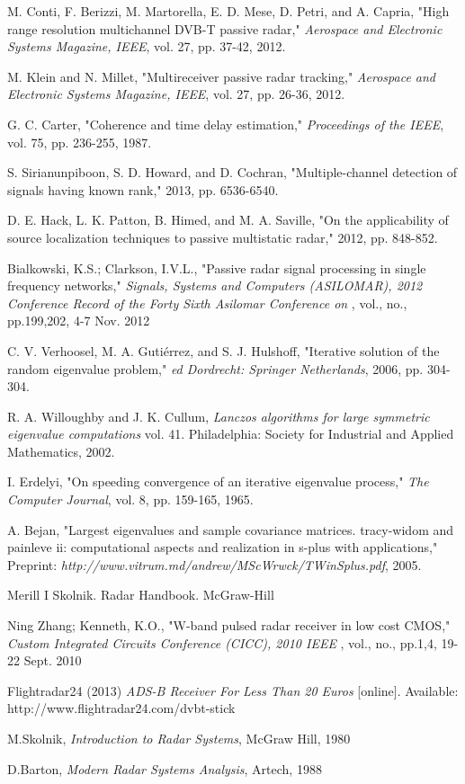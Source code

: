 \documentclass[12pt,openany,a4paper]{book}
\begin{document}
\begin{thebibliography}{99}
 M. Conti, F. Berizzi, M. Martorella, E. D. Mese, D. Petri, and A. Capria, "High range resolution multichannel DVB-T passive radar," \emph{Aerospace and Electronic Systems Magazine, IEEE}, vol. 27, pp. 37-42, 2012.

 M. Klein and N. Millet, "Multireceiver passive radar tracking," \emph{Aerospace and Electronic Systems Magazine, IEEE}, vol. 27, pp. 26-36, 2012.

 G. C. Carter, "Coherence and time delay estimation," \emph{Proceedings of the IEEE}, vol. 75, pp. 236-255, 1987.

 S. Sirianunpiboon, S. D. Howard, and D. Cochran, "Multiple-channel detection of signals having known rank," 2013, pp. 6536-6540.

 D. E. Hack, L. K. Patton, B. Himed, and M. A. Saville, "On the applicability of source localization techniques to passive multistatic radar," 2012, pp. 848-852.

 Bialkowski, K.S.; Clarkson, I.V.L., "Passive radar signal processing in single frequency networks," \emph{Signals, Systems and Computers (ASILOMAR), 2012 Conference Record of the Forty Sixth Asilomar Conference on} , vol., no., pp.199,202, 4-7 Nov. 2012

 C. V. Verhoosel, M. A. Gutiérrez, and S. J. Hulshoff, "Iterative solution of the random eigenvalue problem," \emph{ed Dordrecht: Springer Netherlands}, 2006, pp. 304-304.

 R. A. Willoughby and J. K. Cullum, \emph{Lanczos algorithms for large symmetric eigenvalue computations} vol. 41. Philadelphia: Society for Industrial and Applied Mathematics, 2002.

 I. Erdelyi, "On speeding convergence of an iterative eigenvalue process," \emph{The Computer Journal}, vol. 8, pp. 159-165, 1965.

 A. Bejan, "Largest eigenvalues and sample covariance matrices. tracy-widom and painleve ii: computational aspects and realization in s-plus with applications," Preprint: \emph{http://www.vitrum.md/andrew/MScWrwck/TWinSplus.pdf}, 2005.

 Merill I Skolnik. Radar Handbook. McGraw-Hill

 Ning Zhang; Kenneth, K.O., "W-band pulsed radar receiver in low cost CMOS," \emph{Custom Integrated Circuits Conference (CICC), 2010 IEEE} , vol., no., pp.1,4, 19-22 Sept. 2010

 Flightradar24 (2013) \emph{ADS-B Receiver For Less Than 20 Euros} [online]. Available: http://www.flightradar24.com/dvbt-stick

 M.Skolnik, \emph{Introduction to Radar Systems}, McGraw Hill, 1980

 D.Barton, \emph{Modern Radar Systems Analysis}, Artech, 1988

\end{thebibliography}
\end{document}
